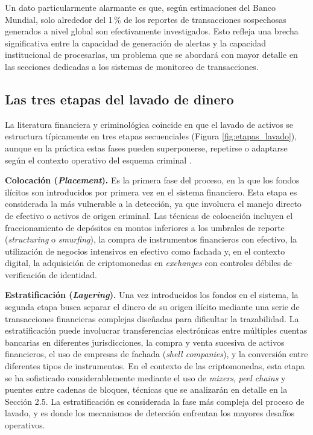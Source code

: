 Un dato particularmente alarmante es que, según estimaciones del Banco Mundial, solo alrededor del 1\,\% de los reportes de transacciones sospechosas generados a nivel global son efectivamente investigados. Esto refleja una brecha significativa entre la capacidad de generación de alertas y la capacidad institucional de procesarlas, un problema que se abordará con mayor detalle en las secciones dedicadas a los sistemas de monitoreo de transacciones.

\subsection{Las tres etapas del lavado de dinero}

La literatura financiera y criminológica coincide en que el lavado de activos se estructura típicamente en tres etapas secuenciales (Figura \ref{fig:etapas_lavado}), aunque en la práctica estas fases pueden superponerse, repetirse o adaptarse según el contexto operativo del esquema criminal \cite{FATF2012InternationalRecommendations}.

\textbf{Colocación (\textit{Placement}).} Es la primera fase del proceso, en la que los fondos ilícitos son introducidos por primera vez en el sistema financiero. Esta etapa es considerada la más vulnerable a la detección, ya que involucra el manejo directo de efectivo o activos de origen criminal. Las técnicas de colocación incluyen el fraccionamiento de depósitos en montos inferiores a los umbrales de reporte (\textit{structuring} o \textit{smurfing}), la compra de instrumentos financieros con efectivo, la utilización de negocios intensivos en efectivo como fachada y, en el contexto digital, la adquisición de criptomonedas en \textit{exchanges} con controles débiles de verificación de identidad. 

\textbf{Estratificación (\textit{Layering}).} Una vez introducidos los fondos en el sistema, la segunda etapa busca separar el dinero de su origen ilícito mediante una serie de transacciones financieras complejas diseñadas para dificultar la trazabilidad. La estratificación puede involucrar transferencias electrónicas entre múltiples cuentas bancarias en diferentes jurisdicciones, la compra y venta sucesiva de activos financieros, el uso de empresas de fachada (\textit{shell companies}), y la conversión entre diferentes tipos de instrumentos. En el contexto de las criptomonedas, esta etapa se ha sofisticado considerablemente mediante el uso de \textit{mixers}, \textit{peel chains} y puentes entre cadenas de bloques, técnicas que se analizarán en detalle en la Sección 2.5. La estratificación es considerada la fase más compleja del proceso de lavado, y es donde los mecanismos de detección enfrentan los mayores desafíos operativos.

